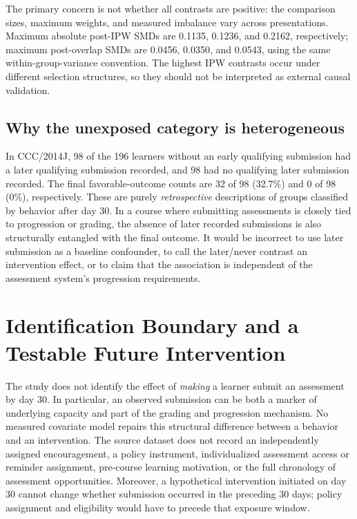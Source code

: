 \documentclass[10pt,a4paper]{article}
\begin{document}
The primary concern is not whether all contrasts are positive: the comparison sizes, maximum weights, and measured imbalance vary across presentations. Maximum absolute post-IPW SMDs are 0.1135, 0.1236, and 0.2162, respectively; maximum post-overlap SMDs are 0.0456, 0.0350, and 0.0543, using the same within-group-variance convention. The highest IPW contrasts occur under different selection structures, so they should not be interpreted as external causal validation.

\subsection{Why the unexposed category is heterogeneous}
In CCC/2014J, 98 of the 196 learners without an early qualifying submission had a later qualifying submission recorded, and 98 had no qualifying later submission recorded. The final favorable-outcome counts are 32 of 98 (32.7\%) and 0 of 98 (0\%), respectively. These are purely \emph{retrospective} descriptions of groups classified by behavior after day 30. In a course where submitting assessments is closely tied to progression or grading, the absence of later recorded submissions is also structurally entangled with the final outcome. It would be incorrect to use later submission as a baseline confounder, to call the later/never contrast an intervention effect, or to claim that the association is independent of the assessment system's progression requirements.

\section{Identification Boundary and a Testable Future Intervention}
The study does not identify the effect of \emph{making} a learner submit an assessment by day 30. In particular, an observed submission can be both a marker of underlying capacity and part of the grading and progression mechanism. No measured covariate model repairs this structural difference between a behavior and an intervention. The source dataset does not record an independently assigned encouragement, a policy instrument, individualized assessment access or reminder assignment, pre-course learning motivation, or the full chronology of assessment opportunities. Moreover, a hypothetical intervention initiated on day 30 cannot change whether submission occurred in the preceding 30 days; policy assignment and eligibility would have to precede that exposure window.
\end{document}
